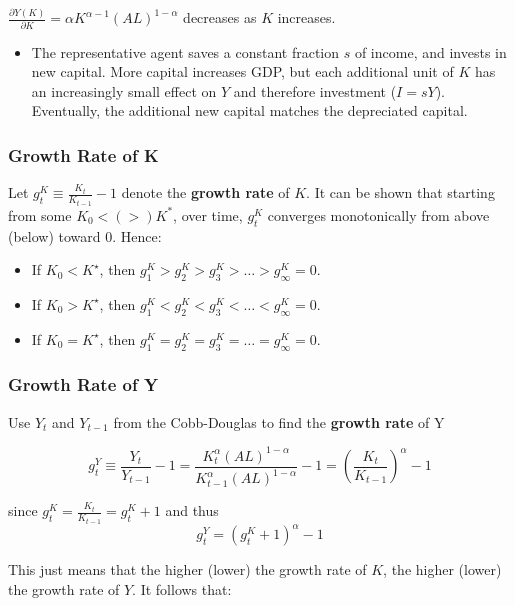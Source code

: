 \documentclass[11pt]{article}
\begin{document}
$\frac{\partial Y(K)}{\partial K} = \alpha K^{\alpha-1}(AL)^{1-\alpha}$ decreases as $K$ increases.

\begin{itemize}
    \item The representative agent saves a constant fraction $s$ of income, and invests in new capital. More capital increases GDP, but each additional unit of $K$ has an increasingly small effect on $Y$ and therefore investment ($I = sY$). Eventually, the additional new capital matches the depreciated capital.
\end{itemize}

\subsubsection{Growth Rate of K}

Let $g_t^K \equiv \frac{K_t}{K_{t-1}}-1$ denote the \textbf{growth rate} of $K$. It can be shown that starting from some $K_0<(>) K^*$, over time, $g_t^K$ converges monotonically from above (below) toward 0. Hence:
\begin{itemize}
    \item If $K_0<K^{\star}$, then $g_1^K>g_2^K>g_3^K>\ldots>g_{\infty}^K=0$.
    \item If $K_0>K^{\star}$, then $g_1^K<g_2^K<g_3^K<\ldots<g_{\infty}^K=0$.
    \item If $K_0=K^{\star}$, then $g_1^K=g_2^K=g_3^K=\ldots=g_{\infty}^K=0$.
\end{itemize}

\subsubsection{Growth Rate of Y}

Use $Y_t$ and $Y_{t-1}$ from the Cobb-Douglas to find the \textbf{growth rate} of Y

\begin{equation}
g_t^Y \equiv \frac{Y_t}{Y_{t-1}}-1=\frac{K_t^\alpha(A L)^{1-\alpha}}{K_{t-1}^\alpha(A L)^{1-\alpha}}-1=\left(\frac{K_t}{K_{t-1}}\right)^\alpha-1
\end{equation}

since $g_t^K = \frac{K_t}{K_{t-1}}=g_t^K + 1$ and thus
\begin{equation}
g_t^Y=\left(g_t^K+1\right)^\alpha-1
\end{equation}

This just means that the higher (lower) the growth rate of $K$, the higher (lower) the growth rate of $Y$. It follows that:
\end{document}
